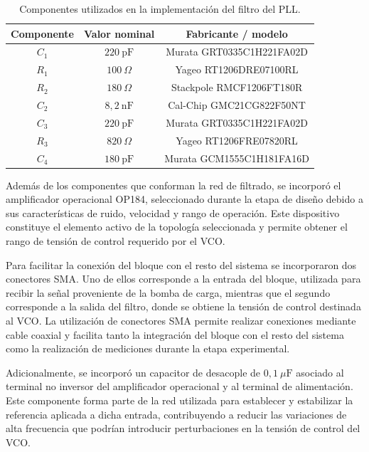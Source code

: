\begin{table}[H]
\centering
\begin{tabular}{ccc}
\hline
\textbf{Componente} & \textbf{Valor nominal} & \textbf{Fabricante / modelo} \\
\hline
$C_1$ & $220~\mathrm{pF}$ & Murata GRT0335C1H221FA02D \\
$R_1$ & $100~\Omega$ & Yageo RT1206DRE07100RL \\
$R_2$ & $180~\Omega$ & Stackpole RMCF1206FT180R \\
$C_2$ & $8{,}2~\mathrm{nF}$ & Cal-Chip GMC21CG822F50NT \\
$C_3$ & $220~\mathrm{pF}$ & Murata GRT0335C1H221FA02D \\
$R_3$ & $820~\Omega$ & Yageo RT1206FRE07820RL \\
$C_4$ & $180~\mathrm{pF}$ & Murata GCM1555C1H181FA16D \\
\hline
\end{tabular}
\caption{Componentes utilizados en la implementación del filtro del PLL.}
\label{tab:componentes_filtro}
\end{table}

Además de los componentes que conforman la red de filtrado, se incorporó el amplificador operacional OP184, seleccionado durante la etapa de diseño debido a sus características de ruido, velocidad y rango de operación. Este dispositivo constituye el elemento activo de la topología seleccionada y permite obtener el rango de tensión de control requerido por el VCO.

Para facilitar la conexión del bloque con el resto del sistema se incorporaron dos conectores SMA. Uno de ellos corresponde a la entrada del bloque, utilizada para recibir la señal proveniente de la bomba de carga, mientras que el segundo corresponde a la salida del filtro, donde se obtiene la tensión de control destinada al VCO. La utilización de conectores SMA permite realizar conexiones mediante cable coaxial y facilita tanto la integración del bloque con el resto del sistema como la realización de mediciones durante la etapa experimental.

Adicionalmente, se incorporó un capacitor de desacople de $0{,}1~\mu\mathrm{F}$ asociado al terminal no inversor del amplificador operacional y al terminal de alimentación. Este componente forma parte de la red utilizada para establecer y estabilizar la referencia aplicada a dicha entrada, contribuyendo a reducir las variaciones de alta frecuencia que podrían introducir perturbaciones en la tensión de control del VCO.

